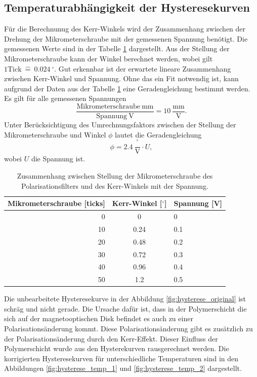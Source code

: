 \subsection{Temperaturabhängigkeit der Hysteresekurven}
Für die Berechnunug des Kerr-Winkels wird der Zusammenhang zwischen der Drehung der Mikrometerschraube mit der gemessenen Spannung benötigt. Die gemessenen Werte sind in der Tabelle \ref{tab:Mikrometerschraube} dargestellt. Aus der Stellung der Mikrometerschraube kann der Winkel berechnet werden, wobei gilt $ 1 \mathrm{Tick}\ \widehat{=}\ 0.024\ {}^\circ$. Gut erkennbar ist der erwartete lineare Zusammenhang zwischen Kerr-Winkel und Spannung. Ohne das ein Fit notwendig ist, kann aufgrund der Daten aus der Tabelle \ref{tab:Mikrometerschraube} eine Geradengleichung bestimmt werden. Es gilt für alle gemessenen Spannungen
\begin{equation}
\frac{\mathrm{Mikrometerschraube}\ \mathrm{mm}} {\mathrm{Spannung}\ \mathrm{V}} = 10\ \frac{\mathrm{mm}}{\mathrm{V}}.
\end{equation}
Unter Berücksichtigung des Umrechnungsfaktors zwischen der Stellung der Mikrometerschraube und Winkel $\phi$ lautet die Geradengleichung 
\begin{equation}
\phi = 2.4\ \frac{{ }^\circ}{\mathrm{V}} \cdot U,
\end{equation}
wobei $U$ die Spannung ist. 

\begin{table}[h]
    \centering
    \caption{
        Zusammenhang zwischen Stellung der Mikrometerschraube des Polarisationsfilters und  des Kerr-Winkels mit der Spannung.
        }
    \label{tab:Mikrometerschraube}
    \begin{tabular}{r|c|l}
    Mikrometerschraube [ticks] & Kerr-Winkel [${}^\circ$]& Spannung [V] \\\hline
    0  & 0 & 0
 \\
    10 & 0.24 & 0.1
 \\
    20 & 0.48 & 0.2
 \\
    30 & 0.72 & 0.3
 \\
    40 & 0.96 & 0.4
 \\
    50 & 1.2 & 0.5 \\   
    \end{tabular}
\end{table}
Die unbearbeitete Hysteresekurve in der Abbildung \ref{fig:hysterese_original} ist schräg und nicht gerade. Die Ursache dafür ist, dass in der Polymerschicht die sich auf der magnetooptischen Disk befindet es auch zu einer Polarisationsänderung kommt. Diese Polarisationsänderung gibt es zusätzlich zu der Polarisationsänderung durch den Kerr-Effekt. Dieser Einfluss der Polymerschicht wurde aus den Hysterekurven rausgerechnet werden. Die korrigierten Hysteresekurven für unterschiedliche Temperaturen  sind in den Abbildungen \ref{fig:hysterese_temp_1} und \ref{fig:hysterese_temp_2} dargestellt. 


